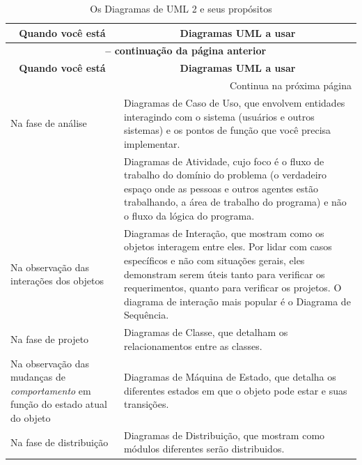 \begin{longtable}[l]{p{4.9cm}p{11cm}}
\caption{Os Diagramas de UML 2 e seus propósitos} \label{tab:useUML}\\

\multicolumn{1}{c}{\textbf{Quando você está}} & \multicolumn{1}{c}{\textbf{Diagramas UML a usar}} \\
\midrule
\endfirsthead

\multicolumn{2}{c}{{\bfseries \tablename\ \thetable{} -- continuação da página anterior}} \\
\multicolumn{1}{c}{\textbf{Quando você está}} & \multicolumn{1}{c}{\textbf{Diagramas UML a usar}} \\
\midrule
\endhead

\multicolumn{2}{r}{{Continua na próxima página}} \\%
\endfoot

\hline %
\endlastfoot

Na fase de análise & Diagramas de Caso de Uso, que envolvem entidades interagindo com o sistema (usuários e outros sistemas) e os pontos de função que você precisa implementar.\\

 & Diagramas de Atividade, cujo foco é o fluxo de trabalho do domínio do problema (o verdadeiro espaço onde as pessoas e outros agentes estão trabalhando, a área de trabalho do programa) e não o fluxo da lógica do programa.\\[0.3cm]
 
Na observação das interações dos objetos & Diagramas de Interação, que mostram como os objetos interagem entre eles. Por lidar com casos específicos e não com situações gerais, eles demonstram serem úteis tanto para verificar os requerimentos, quanto para verificar os projetos. O diagrama de interação mais popular é o Diagrama de Sequência. \\[0.3cm]

Na fase de projeto & Diagramas de Classe, que detalham os relacionamentos entre as classes.\\[0.3cm]

Na observação das mudanças de \textit{comportamento} em função do estado atual do objeto & Diagramas de Máquina de Estado, que detalha os diferentes estados em que o objeto pode estar e suas transições.\\[0.6cm]

Na fase de distribuição & Diagramas de Distribuição, que mostram como módulos diferentes serão distribuidos.

\end{longtable}
\\

